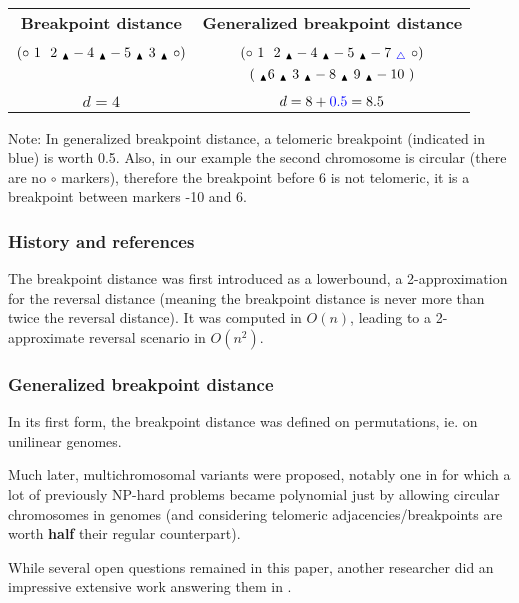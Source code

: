 \documentclass[11pt,final,twoside,nofrench]{thlifl}
\newcommand{\breakpoint}{ \textsubscript{$\textcolor{black}{\blacktriangle}$} }
\begin{document}
\begin{center}

\begin{tabular}{c @{\hskip 1cm}|@{\hskip 0.5cm} c}
\textbf{Breakpoint distance} & \textbf{Generalized breakpoint distance} \\
& \\
$(\circ~1~~2~\breakpoint-4~\breakpoint-5~\breakpoint~3~\breakpoint~\circ)$ & $(\circ~1~~2~\breakpoint-4~\breakpoint-5~\breakpoint-7~\textcolor{blue}{{}_{\triangle}}~\circ)$ \\
 & $(~\breakpoint6~\breakpoint~3~\breakpoint-8~\breakpoint~9~\breakpoint-10~)$\\
 & \\
$d = 4$ & $d = 8 + \textcolor{blue}{0.5} = 8.5$
\end{tabular}
\end{center}

Note: In generalized breakpoint distance, a telomeric breakpoint (indicated in blue) is worth 0.5. Also, in our example the second chromosome is circular (there are no $\circ$ markers), therefore the breakpoint before 6 is not telomeric, it is a breakpoint between markers -10 and 6.

\subsubsection*{History and references}

The breakpoint distance was first introduced as a lowerbound, a 2-approximation for the reversal distance \cite{KS93} (meaning the breakpoint distance is never more than twice the reversal distance). It was computed in $O(n)$, leading to a 2-approximate reversal scenario in $O(n^2)$.

\subsubsection*{Generalized breakpoint distance}

In its first form, the breakpoint distance was defined on permutations, ie. on unilinear genomes.

Much later, multichromosomal variants were proposed, notably one in \cite{TZS09} for which a lot of previously NP-hard problems became polynomial just by allowing circular chromosomes in genomes (and considering telomeric adjacencies/breakpoints are worth \textbf{half} their regular counterpart).

While several open questions remained in this paper, another researcher did an impressive extensive work answering them in \cite{K11}.
\end{document}
